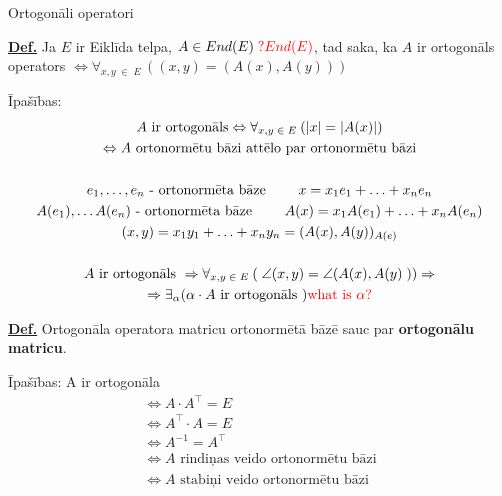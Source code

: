 \documentclass[12pt]{article}
\begin{document}
\pagebreak

Ortogonāli operatori %

\textbf{\underline{Def.}} Ja $E$ ir Eiklīda telpa, $A \in End(E) \color{red}{ \; ? End(E)} $, tad saka, ka $A$ ir ortogonāls operators $\Leftrightarrow \forall_{x,y \; \in \; E \;} ((x,y) = (A(x), A(y)))$ 

Īpašības: %
\begin{gather*}
	A \text{ ir ortogonāls} \Leftrightarrow  \forall_{x,y \; \in \; E \;} (|x| = |A(x)|) \\ 
	\Leftrightarrow A \text{ ortonormētu bāzi  attēlo par ortonormētu bāzi} \\ %
	\\
	e_1, \ldots, e_n \text{ - ortonormēta bāze } \quad  \quad x = x_1e_1 + \ldots + x_ne_n \\
	A(e_1), \ldots A(e_n)  \text{ - ortonormēta bāze } \quad  \quad A(x) = x_1A(e_1) + \ldots + x_nA(e_n) \\
	(x,y) = x_1y_1 + \ldots + x_ny_n = (A(x), A(y))_{A(e)} \\
	\\
	A \text{ ir ortogonāls } \Rightarrow \forall_{x,y \; \in \; E \;} ( \; \angle(x,y) = \angle(A(x), A(y) \; )) \Rightarrow \\
	\Rightarrow \exists_\alpha (\alpha \cdot A \text{ ir ortogonāls }) \color{red}{\text{what is } \alpha ? }\\ 
\end{gather*}

\textbf{\underline{Def.}} Ortogonāla operatora matricu ortonormētā bāzē sauc par \textbf{ortogonālu matricu}.

Īpašības: %
A ir ortogonāla
\begin{gather*} %
	 \Leftrightarrow A \cdot A^{\intercal} = E \\
	 \Leftrightarrow A^{\intercal} \cdot A = E \\
	 \Leftrightarrow A^{-1} = A^{\intercal} \\
	 \Leftrightarrow A \text{ rindiņas veido ortonormētu bāzi} \\
	 \Leftrightarrow A \text{ stabiņi veido ortonormētu bāzi} \\
\end{gather*}

\begin{gather}
\end{gather}
\end{document}
